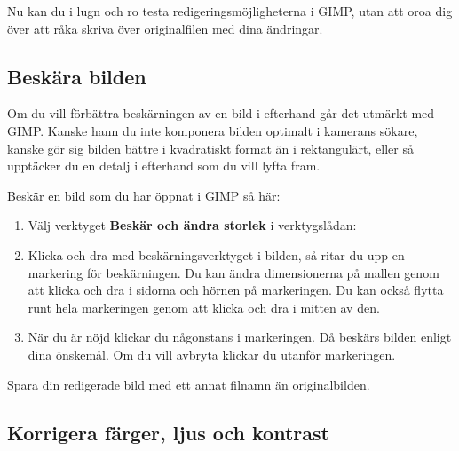 \documentclass[a4paper,final]{memoir} %
\begin{document}
Nu kan du i lugn och ro testa redigeringsmöjligheterna i GIMP, utan att oroa dig över att råka skriva över originalfilen med dina ändringar.

\subsection{Beskära bilden}


Om du vill förbättra beskärningen av en bild i efterhand går det utmärkt med GIMP. Kanske hann du inte komponera bilden optimalt i kamerans sökare, kanske gör sig bilden bättre i kvadratiskt format än i rektangulärt, eller så upptäcker du en detalj i efterhand som du vill lyfta fram.

Beskär en bild som du har öppnat i GIMP så här:

\begin{enumerate}


\item Välj verktyget \textbf{Beskär och ändra storlek} i verktygslådan:



\item Klicka och dra med beskärningsverktyget i bilden, så ritar du upp en markering för beskärningen. Du kan ändra dimensionerna på mallen genom att klicka och dra i sidorna och hörnen på markeringen. Du kan också flytta runt hela markeringen genom att klicka och dra i mitten av den.

\item När du är nöjd klickar du någonstans i markeringen. Då beskärs bilden enligt dina önskemål. Om du vill avbryta klickar du utanför markeringen.

\end{enumerate}

Spara din redigerade bild med ett annat filnamn än originalbilden.

\subsection{Korrigera färger, ljus och kontrast}
\end{document}
